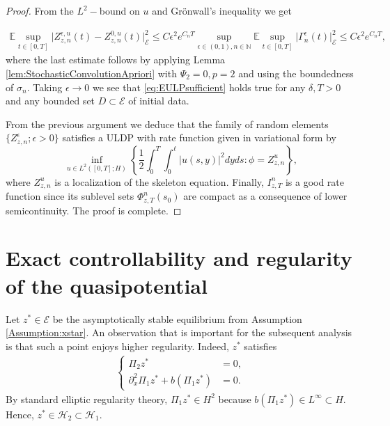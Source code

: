 \documentclass[10pt, reqno]{amsart}
\newcommand{\N}{\mathbb{N}}
\newcommand{\ex}{\mathbb{E}}
\newcommand{\h}{\mathcal{H}}
\newcommand{\e}{\mathcal{E}}
\theoremstyle{definition}
\numberwithin{lem}{section}
\numberwithin{cor}{section}
\numberwithin{prop}{section}
\numberwithin{thm}{section}
\numberwithin{dfn}{section}
\begin{document}
\begin{proof}
\noindent From the $L^2-$bound on $u$ and Gr\"onwall's inequality we get

\begin{equation*}
\begin{aligned}
\ex\sup_{t\in[0,T]}\big|Z_{z,n}^{\epsilon,u}(t)-Z_{z,n}^{0,u}(t)\big|^2_{\e}\leq C \epsilon^2e^{C_{n}T}\sup_{\epsilon\in(0,1), n\in\N}\ex\sup_{t\in[0,T]}\big|\Gamma_{n}^\epsilon(t)\big|^2_\e\leq C\epsilon^2e^{C_{n}T},
\end{aligned}
\end{equation*}
 \noindent where the last estimate follows by applying Lemma \ref{lem:StochasticConvolutionApriori} with $\Psi_2=0, p=2$ and using the boundedness of $\sigma_n.$  Taking $\epsilon\to 0$ we see that \eqref{eq:EULPsufficient} holds true for any $\delta, T>0$ and any bounded set $D\subset\e$ of initial data. 

 From the previous argument we deduce that the family of random elements  $\{Z^{\epsilon}_{z, n}; \epsilon>0\}$ satisfies a ULDP with rate function given in variational form by 
$$ \inf_{u\in L^2([0,T];H)} \left\{ \frac{1}{2}\int_0^T \int_0^\ell |u(s,y)|^2 dyds: \phi=Z^{u}_{z, n}  \right\},$$
where $Z^u_{z,n}$ is a localization of the skeleton equation. 
Finally, $I^n_{z,T}$ is a good rate function since its sublevel sets $\Phi^{n}_{z,T}(s_0)$  
are compact as a consequence of lower semicontinuity. The proof is complete.
\end{proof}










                  
          
      
    
     
 







 



 





 
 \section{Exact controllability and regularity of the quasipotential}\label{sec:Controllability} 



 Let $z^* \in \e$ be the asymptotically stable equilibrium from Assumption \ref{Assumption:xstar}. An observation that is important for the subsequent analysis is that such a point enjoys higher regularity. Indeed, $z^*$ satisfies 
\begin{align*}
\begin{cases}
    \Pi_2 z^*& = 0, \\
    \partial^2_x \Pi_1z^* + b(\Pi_1 z^*) &= 0.\end{cases}
\end{align*}
By standard elliptic regularity theory, %
$\Pi_1 z^* \in H^2$ because $b(\Pi_1 z^*) \in L^\infty \subset H$. Hence, $z^* \in \h_2\subset \h_1$.
\end{document}
